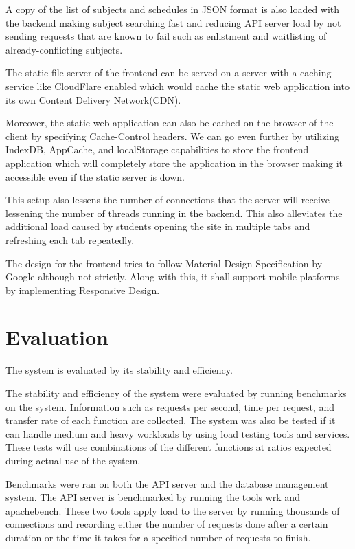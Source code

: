 \documentclass{sigchi}
\begin{document}
A copy of the list of subjects and schedules in JSON format is also loaded with the backend
making subject searching fast and reducing API server load by not sending requests that are known 
to fail such as enlistment and waitlisting of already-conflicting subjects.

The static file server of the frontend can be served on a server with a caching service
like CloudFlare enabled which would cache the static web application into its own 
Content Delivery Network(CDN).

Moreover, the static web application can also be cached on the browser of the client by specifying Cache-Control headers. We can go even further by utilizing IndexDB, AppCache, and localStorage capabilities to store the frontend application which will completely store the application in the browser making it accessible even if the static server is down.

This setup also lessens the number of connections that the server will receive lessening the number of threads running in the backend. This also alleviates the additional load caused by students opening the site in multiple tabs and refreshing each tab repeatedly.

The design for the frontend tries to follow Material Design Specification by Google although not strictly. Along with this, it shall support mobile platforms by implementing Responsive Design. 

\section{Evaluation}

The system is evaluated by its stability and efficiency.

The stability and efficiency of the system were evaluated by running benchmarks on the system. Information such as requests per second, time per request, and transfer rate of each function are collected. The system was also be tested if it can handle medium and heavy workloads by using load testing tools and services. These tests will use combinations of the different functions at ratios expected during actual use of the system. 

Benchmarks were ran on both the API server and the database management system. The API server is benchmarked by running the tools wrk and apachebench. These two tools apply load to the server by running thousands of connections and recording either the number of requests done after a certain duration or the time it takes for a specified number of requests to finish.
\end{document}
